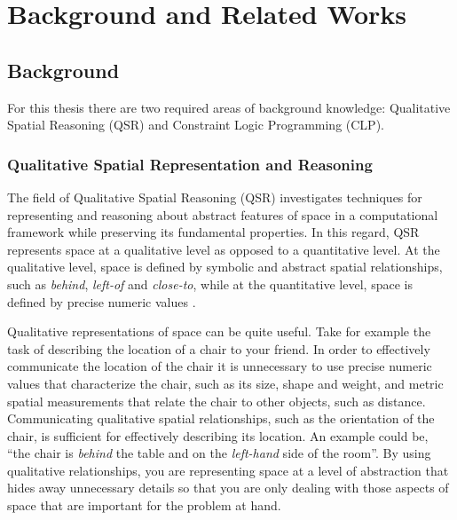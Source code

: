 \documentclass[12pt]{ucthesis}
\begin{document}




\chapter{Background and Related Works} 

\section{Background}
\label{background}
For this thesis there are two required areas of background knowledge: Qualitative Spatial Reasoning (QSR) and Constraint Logic Programming (CLP).

\subsection{Qualitative Spatial Representation and Reasoning}
The field of Qualitative Spatial Reasoning (QSR) investigates techniques for representing and reasoning about abstract features of space in a computational framework while preserving its fundamental properties. In this regard, QSR represents space at a qualitative level as opposed to a quantitative level. At the qualitative level, space is defined by symbolic and abstract spatial relationships, such as \emph{behind}, \emph{left-of} and \emph{close-to}, while at the quantitative level, space is defined by precise numeric values \cite{freksa1991qsr} \cite{bhattSpatialComputing}. 

Qualitative representations of space can be quite useful. Take for example the task of describing the location of a chair to your friend. 
In order to effectively communicate the location of the chair it is unnecessary to use precise numeric values that characterize the chair, such as its size, shape and weight, and metric spatial measurements that relate the chair to other objects, such as distance. Communicating qualitative spatial relationships, such as the orientation of the chair, is sufficient for effectively describing its location. An example could be, ``the chair is \emph{behind} the table and on the \emph{left-hand} side of the room''. By using qualitative relationships, you are representing space at a level of abstraction that hides away unnecessary details so that you are only dealing with those aspects of space that are important for the problem at hand.
\end{document}
